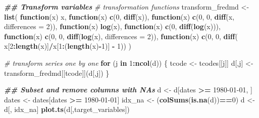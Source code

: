 \documentclass[
]{book}
\newenvironment{Shaded}{\begin{snugshade}}{\end{snugshade}}
\newcommand{\AttributeTok}[1]{\textcolor[rgb]{0.13,0.29,0.53}{#1}}
\newcommand{\CommentTok}[1]{\textcolor[rgb]{0.56,0.35,0.01}{\textit{#1}}}
\newcommand{\ControlFlowTok}[1]{\textcolor[rgb]{0.13,0.29,0.53}{\textbf{#1}}}
\newcommand{\DecValTok}[1]{\textcolor[rgb]{0.00,0.00,0.81}{#1}}
\newcommand{\DocumentationTok}[1]{\textcolor[rgb]{0.56,0.35,0.01}{\textbf{\textit{#1}}}}
\newcommand{\FunctionTok}[1]{\textcolor[rgb]{0.13,0.29,0.53}{\textbf{#1}}}
\newcommand{\NormalTok}[1]{#1}
\newcommand{\OtherTok}[1]{\textcolor[rgb]{0.56,0.35,0.01}{#1}}
\newcommand{\SpecialCharTok}[1]{\textcolor[rgb]{0.81,0.36,0.00}{\textbf{#1}}}
\newcommand{\StringTok}[1]{\textcolor[rgb]{0.31,0.60,0.02}{#1}}
\begin{document}
\begin{Shaded}
\begin{Highlighting}[]
\DocumentationTok{\#\# Transform variables}
\CommentTok{\# transformation functions}
\NormalTok{transform\_fredmd }\OtherTok{\textless{}{-}} \FunctionTok{list}\NormalTok{(}
  \ControlFlowTok{function}\NormalTok{(x) x,}
  \ControlFlowTok{function}\NormalTok{(x) }\FunctionTok{c}\NormalTok{(}\DecValTok{0}\NormalTok{, }\FunctionTok{diff}\NormalTok{(x)),}
  \ControlFlowTok{function}\NormalTok{(x) }\FunctionTok{c}\NormalTok{(}\DecValTok{0}\NormalTok{, }\DecValTok{0}\NormalTok{, }\FunctionTok{diff}\NormalTok{(x, }\AttributeTok{differences =} \DecValTok{2}\NormalTok{)),}
  \ControlFlowTok{function}\NormalTok{(x) }\FunctionTok{log}\NormalTok{(x),}
  \ControlFlowTok{function}\NormalTok{(x) }\FunctionTok{c}\NormalTok{(}\DecValTok{0}\NormalTok{, }\FunctionTok{diff}\NormalTok{(}\FunctionTok{log}\NormalTok{(x))),}
  \ControlFlowTok{function}\NormalTok{(x) }\FunctionTok{c}\NormalTok{(}\DecValTok{0}\NormalTok{, }\DecValTok{0}\NormalTok{, }\FunctionTok{diff}\NormalTok{(}\FunctionTok{log}\NormalTok{(x), }\AttributeTok{differences =} \DecValTok{2}\NormalTok{)),}
  \ControlFlowTok{function}\NormalTok{(x) }\FunctionTok{c}\NormalTok{(}\DecValTok{0}\NormalTok{, }\DecValTok{0}\NormalTok{, }\FunctionTok{diff}\NormalTok{( x[}\DecValTok{2}\SpecialCharTok{:}\FunctionTok{length}\NormalTok{(x)]}\SpecialCharTok{/}\NormalTok{x[}\DecValTok{1}\SpecialCharTok{:}\NormalTok{(}\FunctionTok{length}\NormalTok{(x)}\SpecialCharTok{{-}}\DecValTok{1}\NormalTok{)] }\SpecialCharTok{{-}} \DecValTok{1}\NormalTok{))}
\NormalTok{)}

\CommentTok{\# transform series one by one}
\ControlFlowTok{for}\NormalTok{ (j }\ControlFlowTok{in} \DecValTok{1}\SpecialCharTok{:}\FunctionTok{ncol}\NormalTok{(d)) \{}
\NormalTok{  tcode }\OtherTok{\textless{}{-}}\NormalTok{ tcodes[[j]]}
\NormalTok{  d[,j] }\OtherTok{\textless{}{-}}\NormalTok{ transform\_fredmd[[tcode]](d[,j])}
\NormalTok{\}}

\DocumentationTok{\#\# Subset and remove columns with NAs}
\NormalTok{d }\OtherTok{\textless{}{-}}\NormalTok{ d[dates }\SpecialCharTok{\textgreater{}=} \StringTok{\textquotesingle{}1980{-}01{-}01\textquotesingle{}}\NormalTok{, ]}
\NormalTok{dates }\OtherTok{\textless{}{-}}\NormalTok{ dates[dates }\SpecialCharTok{\textgreater{}=} \StringTok{\textquotesingle{}1980{-}01{-}01\textquotesingle{}}\NormalTok{]}
\NormalTok{idx\_na }\OtherTok{\textless{}{-}}\NormalTok{ (}\FunctionTok{colSums}\NormalTok{(}\FunctionTok{is.na}\NormalTok{(d))}\SpecialCharTok{==}\DecValTok{0}\NormalTok{)}
\NormalTok{d }\OtherTok{\textless{}{-}}\NormalTok{ d[, idx\_na]}
\FunctionTok{plot.ts}\NormalTok{(d[,target\_variables])}
\end{Highlighting}
\end{Shaded}
\end{document}
